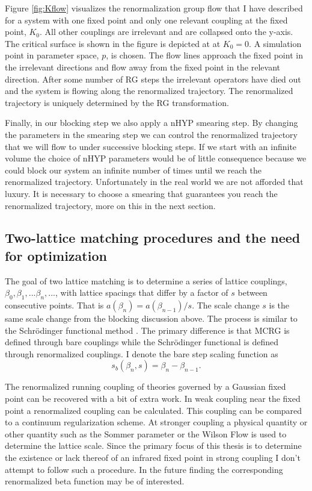 Figure \ref{fig:Kflow} visualizes the renormalization group flow that I have described for a system with one fixed point and only one relevant coupling at the fixed point, $K_0$.
All other couplings are irrelevant and are collapsed onto the y-axis.
The critical surface is shown in the figure is depicted at at $K_0=0$.
A simulation point in parameter space, $p$, is chosen.
The flow lines approach the fixed point in the irrelevant directions and flow away from the fixed point in the relevant direction.
After some number of RG steps the irrelevant operators have died out and the system is flowing along the renormalized trajectory.
The renormalized trajectory is uniquely determined by the RG transformation.


Finally, in our blocking step we also apply a nHYP smearing step.
By changing the parameters in the smearing step we can control the renormalized trajectory that we will flow to under successive blocking steps.
If we start with an infinite volume the choice of nHYP parameters would be of little consequence because we could block our system an infinite number of times until we reach the renormalized trajectory.
Unfortunately in the real world we are not afforded that luxury.
It is necessary to choose a smearing that guarantees you reach the renormalized trajectory, more on this in the next section.

\subsection{Two-lattice matching procedures and the need for optimization} %
The goal of two lattice matching is to determine a series of lattice couplings, $\beta_0,\beta_1,...\beta_n,...$, with lattice spacings that differ by a factor of $s$ between consecutive points.
That is $a(\beta_n)=a(\beta_{n-1})/s$.
The scale change $s$ is the same scale change from the blocking discussion above.
The process is similar to the Schr\"odinger functional method \cite{}.
The primary difference is that MCRG is defined through bare couplings while the Schr\"odinger functional is defined through renormalized couplings.
I denote the bare step scaling function as 
\begin{equation}
  s_b(\beta_n,s)=\beta_n-\beta_{n-1}.
\end{equation}

The renormalized running coupling of theories governed by a Gaussian fixed point can be recovered with a bit of extra work.
In weak coupling near the fixed point a renormalized coupling can be calculated.
This coupling can be compared to a continuum regularization scheme.
At stronger coupling a physical quantity or other quantity such as the Sommer parameter or the Wilson Flow is used to determine the lattice scale.
Since the primary focus of this thesis is to determine the existence or lack thereof of an infrared fixed point in strong coupling I don't attempt to follow such a procedure.
In the future finding the corresponding renormalized beta function may be of interested.

